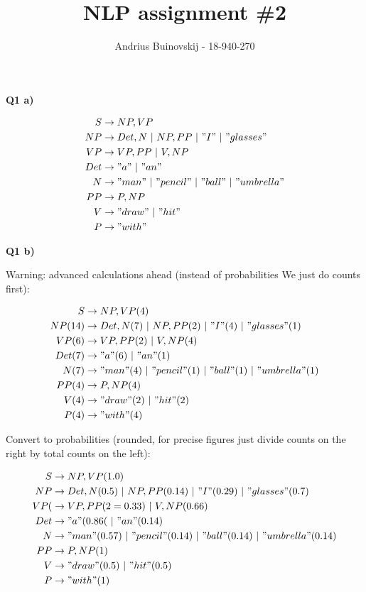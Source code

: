 \documentclass{article}
\newcommand*\OR{\ |\ }
\begin{document}
\title{NLP assignment \#2}
\author{Andrius Buinovskij - 18-940-270}
\date{}

\maketitle

\textbf{Q1 a)}

	\begin{align}
		S &\to NP, VP\\
		NP &\to Det, N \OR NP, PP \OR "I" \OR "glasses"\\
		VP &\to VP, PP \OR V, NP\\		
		Det &\to "a" \OR "an"\\
		N &\to "man" \OR "pencil" \OR "ball" \OR "umbrella"\\
		PP &\to P, NP\\
		V &\to "draw" \OR "hit"\\
		P &\to "with" 
	\end{align}
	
\textbf{Q1 b)}

	Warning: advanced calculations ahead (instead of probabilities We just do counts first):

	\begin{align}
		S &\to NP, VP (4)\\
		NP (14) &\to Det, N (7) \OR NP, PP (2)\OR "I" (4)\OR "glasses" (1)\\
		VP (6)&\to VP, PP (2)\OR V, NP (4)\\		
		Det (7)&\to "a" (6) \OR "an"(1)\\
		N (7)&\to "man" (4)\OR "pencil"(1) \OR "ball"(1) \OR "umbrella"(1)\\
		PP (4)&\to P, NP (4)\\
		V (4)&\to "draw" (2) \OR "hit"(2)\\
		P (4)&\to "with" (4) 
	\end{align}
	
	Convert to probabilities (rounded, for precise figures just divide counts on the right by total counts on the left):
	
	\begin{align}
		S &\to NP, VP (1.0)\\
		NP  &\to Det, N (0.5) \OR NP, PP (0.14)\OR "I" (0.29)\OR "glasses" (0.7)\\
		VP (&\to VP, PP (2=0.33)\OR V, NP (0.66)\\		
		Det &\to "a" (0.86( \OR "an"(0.14)\\
		N &\to "man" (0.57)\OR "pencil"(0.14) \OR "ball"(0.14) \OR "umbrella"(0.14)\\
		PP &\to P, NP (1)\\
		V &\to "draw" (0.5) \OR "hit"(0.5)\\
		P &\to "with" (1) 
	\end{align}
	
\end{document}
